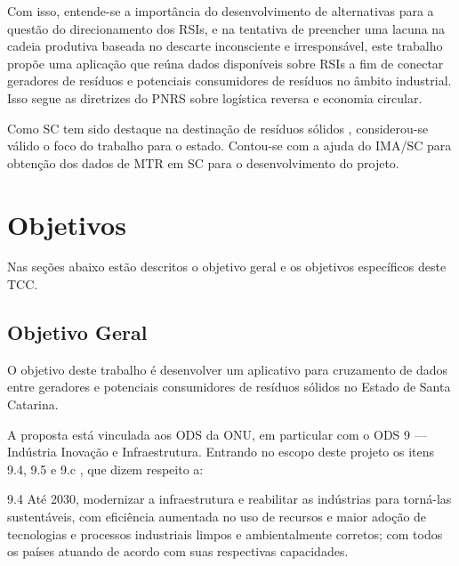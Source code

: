 Com isso, entende-se a importância do desenvolvimento de alternativas para a questão do direcionamento dos \gls{RSI}s, e na tentativa de preencher uma lacuna na cadeia produtiva baseada no descarte inconsciente e irresponsável, este trabalho propõe uma aplicação que reúna dados disponíveis sobre \gls{RSI}s a fim de conectar geradores de resíduos e potenciais consumidores de resíduos no âmbito industrial. Isso segue as diretrizes do \gls{PNRS} sobre logística reversa e economia circular. 

Como \gls{SC} tem sido destaque na destinação de resíduos sólidos \cite{crea_sc_destino_2013}, considerou-se válido o foco do trabalho para o estado. Contou-se com a ajuda do \gls{IMA/SC} para obtenção dos dados de \gls{MTR} em \gls{SC} para o desenvolvimento do projeto.

\section{Objetivos}

Nas seções abaixo estão descritos o objetivo geral e os objetivos específicos deste \gls{TCC}.

\subsection{Objetivo Geral}

O objetivo deste trabalho é desenvolver um aplicativo para cruzamento de dados entre geradores e potenciais consumidores de resíduos sólidos no Estado de Santa Catarina. 

A proposta está vinculada aos \gls{ODS} da \gls{ONU}, em particular com o \gls{ODS} 9 — Indústria Inovação e Infraestrutura. Entrando no escopo deste projeto os itens 9.4, 9.5 e 9.c \cite{noauthor_sustainable_nodate}, que dizem respeito a:

\begin{citacao}
	9.4 Até 2030, modernizar a infraestrutura e reabilitar as indústrias para torná-las sustentáveis, com eficiência aumentada no uso de recursos e maior adoção de tecnologias e processos industriais limpos e ambientalmente corretos; com todos os países atuando de acordo com suas respectivas capacidades.
\end{citacao}

